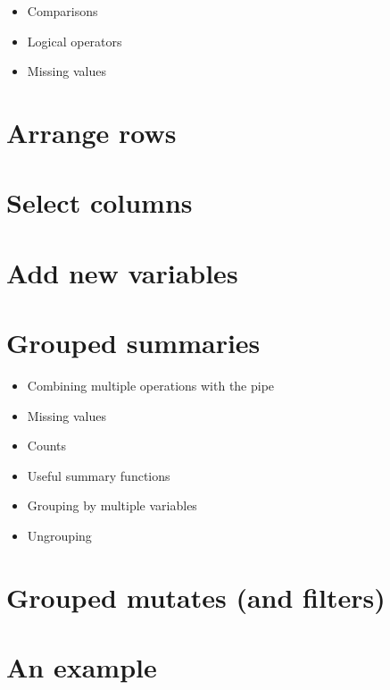 \documentclass[
]{book}
\providecommand{\tightlist}{%
  \setlength{\itemsep}{0pt}\setlength{\parskip}{0pt}}
\begin{document}
\begin{itemize}
\tightlist
\item
  Comparisons
\item
  Logical operators
\item
  Missing values
\end{itemize}

\hypertarget{arrange-rows}{%
\section{Arrange rows}\label{arrange-rows}}

\hypertarget{select-columns}{%
\section{Select columns}\label{select-columns}}

\hypertarget{add-new-variables}{%
\section{Add new variables}\label{add-new-variables}}

\hypertarget{grouped-summaries}{%
\section{Grouped summaries}\label{grouped-summaries}}

\begin{itemize}
\tightlist
\item
  Combining multiple operations with the pipe
\item
  Missing values
\item
  Counts
\item
  Useful summary functions
\item
  Grouping by multiple variables
\item
  Ungrouping
\end{itemize}

\hypertarget{grouped-mutates-and-filters}{%
\section{Grouped mutates (and filters)}\label{grouped-mutates-and-filters}}

\hypertarget{an-example}{%
\section{An example}\label{an-example}}
\end{document}
